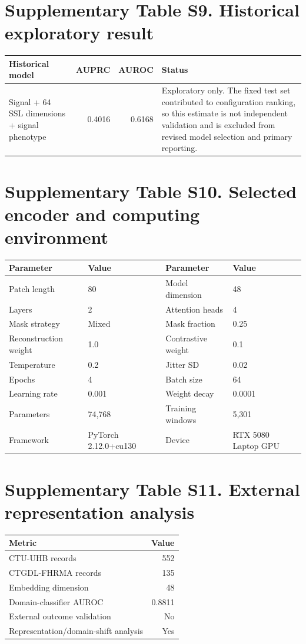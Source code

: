 \documentclass[11pt]{article}
\begin{document}
\section*{Supplementary Table S9. Historical exploratory result}
\begin{tabularx}{\textwidth}{p{4.2cm}rrX}
\toprule
Historical model & AUPRC & AUROC & Status \\
\midrule
Signal + 64 SSL dimensions + signal phenotype & 0.4016 & 0.6168 & Exploratory only. The fixed test set contributed to configuration ranking, so this estimate is not independent validation and is excluded from revised model selection and primary reporting. \\
\bottomrule
\end{tabularx}

\section*{Supplementary Table S10. Selected encoder and computing environment}
\begin{tabular}{ll@{\qquad}ll}
\toprule
Parameter & Value & Parameter & Value \\
\midrule
Patch length & 80 & Model dimension & 48 \\
Layers & 2 & Attention heads & 4 \\
Mask strategy & Mixed & Mask fraction & 0.25 \\
Reconstruction weight & 1.0 & Contrastive weight & 0.1 \\
Temperature & 0.2 & Jitter SD & 0.02 \\
Epochs & 4 & Batch size & 64 \\
Learning rate & 0.001 & Weight decay & 0.0001 \\
Parameters & 74,768 & Training windows & 5,301 \\
Framework & PyTorch 2.12.0+cu130 & Device & RTX 5080 Laptop GPU \\
\bottomrule
\end{tabular}

\section*{Supplementary Table S11. External representation analysis}
\begin{tabular}{lr}
\toprule
Metric & Value \\
\midrule
CTU-UHB records & 552 \\
CTGDL-FHRMA records & 135 \\
Embedding dimension & 48 \\
Domain-classifier AUROC & 0.8811 \\
External outcome validation & No \\
Representation/domain-shift analysis & Yes \\
\bottomrule
\end{tabular}
\end{document}
